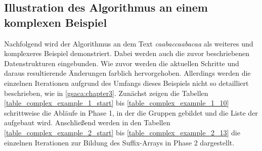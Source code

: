 \newpage
\subsection{Illustration des Algorithmus an einem komplexen Beispiel}
\label{gsaca:chapter6}

Nachfolgend wird der Algorithmus an dem Text \textit{caabaccaabacaa} als weiteres und komplexeres Beispiel demonstriert. 
Dabei werden auch die zuvor beschriebenen Datenstrukturen eingebunden. 
Wie zuvor werden die aktuellen Schritte und daraus resultierende Änderungen farblich hervorgehoben.
Allerdings werden die einzelnen Iterationen aufgrund des Umfangs dieses Beispiels nicht so detailliert beschrieben, wie in \ref{gsaca:chapter3}.
Zunächst zeigen die Tabellen \ref{table_complex_example_1_start} bis \ref{table_complex_example_1_10} schritt\-weise die Abläufe in Phase 1, in der die Gruppen gebildet und die Liste der \prevpointer aufgebaut wird. 
Anschließend werden in den Tabellen \ref{table_complex_example_2_start} bis \ref{table_complex_example_2_13} die einzelnen Iterationen zur Bildung des Suffix-Arrays in Phase 2 dargestellt.


